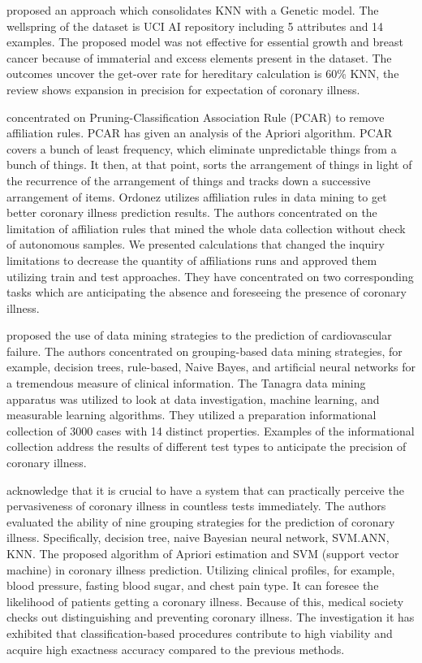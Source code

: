 {\citealp{jabbar2013heart} proposed an approach which consolidates KNN with a Genetic model. The wellspring of the dataset is UCI AI repository including 5 attributes and 14 examples. The proposed model was not effective for essential growth and breast cancer because of immaterial and excess elements present in the dataset. The outcomes uncover the get-over rate for hereditary calculation is 60\% KNN, the review shows expansion in precision for expectation of coronary illness.


\citealp{deepika2011association} concentrated on Pruning-Classification Association Rule (PCAR) to remove affiliation rules. PCAR has given an analysis of the Apriori algorithm. PCAR covers a bunch of least frequency, which eliminate unpredictable things from a bunch of things. It then, at that point, sorts the arrangement of things in light of the recurrence of the arrangement of things and tracks down a successive arrangement of items. Ordonez utilizes affiliation rules in data mining to get better coronary illness prediction results. The authors concentrated on the limitation of affiliation rules that mined the whole data collection without check of autonomous samples. We presented calculations that changed the inquiry limitations to decrease the quantity of affiliations runs and approved them utilizing train and test approaches. They have concentrated on two corresponding tasks which are anticipating the absence and foreseeing the presence of coronary illness.

\citealp{srinivas2010applications} proposed the use of data mining strategies to the prediction of cardiovascular failure. The authors concentrated on grouping-based data mining strategies, for example, decision trees, rule-based, Naive Bayes, and artificial neural networks for a tremendous measure of clinical information. The Tanagra data mining apparatus was utilized to look at data investigation, machine learning, and measurable learning algorithms. They utilized a preparation informational collection of 3000 cases with 14 distinct properties. Examples of the informational collection address the results of different test types to anticipate the precision of coronary illness.

\citealp{sowmiya2021hybrid} acknowledge that it is crucial to have a system that can practically perceive the pervasiveness of coronary illness in countless tests immediately. The authors evaluated the ability of nine grouping strategies for the prediction of coronary illness. Specifically, decision tree, naive Bayesian neural network, SVM.ANN, KNN. The proposed algorithm of Apriori estimation and SVM (support vector machine) in coronary illness prediction. Utilizing clinical profiles, for example, blood pressure, fasting blood sugar, and chest pain type. It can foresee the likelihood of patients getting a coronary illness. Because of this, medical society checks out distinguishing and preventing coronary illness. The investigation it has exhibited that classification-based procedures contribute to high viability and acquire high exactness accuracy compared to the previous methods.

}
